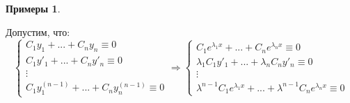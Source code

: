 \documentclass[a4paper, 12pt]{article}
\theoremstyle{definition}
\newtheorem*{example}{Примеры}
\theoremstyle{plain}
\theoremstyle{remark}
\begin{document}
\begin{example}
\begin{enumerate}
      Допустим, что:
      $$\begin{cases}
        C_1y_1 + ... + C_ny_n \equiv 0\\
        C_1y'_1 + ... + C_ny'_n \equiv 0\\
        \vdots\\
        C_1y_1^{(n-1)} + ... + C_ny_n^{(n-1)} \equiv 0
      \end{cases} \Longrightarrow \begin{cases}
        C_1e^{\lambda_1x} + ... + C_ne^{\lambda_nx} \equiv 0\\
        \lambda_1C_1y'_1 + ... + \lambda_nC_ny'_n \equiv 0\\
        \vdots\\
        \lambda^{n-1}C_1e^{\lambda_1x} + ... + \lambda^{n-1}C_ne^{\lambda_nx} \equiv 0
      \end{cases}$$
    \end{enumerate}
  \end{example}
  
\end{document}
